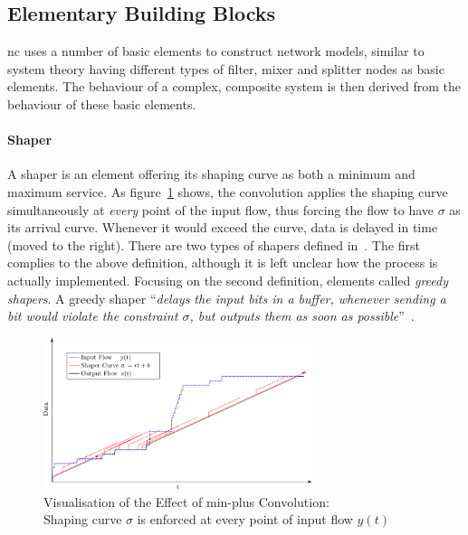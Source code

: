 \subsection{Elementary Building Blocks}
\label{ssec:nc_elementary}
\gls{nc} uses a number of basic elements to construct network models, similar to system theory having different types of filter, mixer and splitter nodes
as basic elements. The behaviour of a complex, composite system is then derived from the behaviour of these basic elements.
\paragraph{Shaper}
A shaper is an element offering its shaping curve as both a minimum and maximum service.
As figure~\ref{fig:nc_basics2} shows, the convolution applies the shaping curve simultaneously at
\emph{every} point of the input flow,  thus forcing the flow to have $\sigma$ as its arrival curve. Whenever it would exceed the curve, data is delayed in time (moved to the right).
There are two types of shapers defined in~\cite{thiran_network_2001}.
The first complies to the above definition, although it is left unclear how the process is actually implemented.
Focusing on the second definition, elements called \emph{greedy shapers}. A greedy shaper \enquote{\textit{delays the input bits in a buffer, whenever sending a bit would violate the constraint $\sigma$, but outputs them as
soon as possible}}~\cite[p. 42]{thiran_network_2001}.
%
\begin{figure}[H]
  \centering
  \includegraphics*[width=0.7\textwidth,height=\textheight,keepaspectratio]{Figures/nc_basics2}
  \caption{Visualisation of the Effect of min-plus Convolution:\\Shaping curve $\sigma$ is enforced at every point of input flow $y(t)$}
  \label{fig:nc_basics2}
\end{figure}
%
